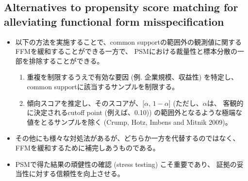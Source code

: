 \subsection{Alternatives to propensity score matching for alleviating functional form misspecification}
\begin{itemize}
 \item 以下の方法を実施することで、common supportの範囲外の観測値に関するFFMを緩和することができる一方で、
       PSMにおける裁量性と標本分散の一部を排除することができる。
       \begin{enumerate}
        \item 重複を制限するうえで有効な要因 (例. 企業規模、収益性) を特定し、common supportに該当するサンプルを制限する。
        \item 傾向スコアを推定し、そのスコアが、[$\alpha$, $1-\alpha$] (ただし、$\alpha$は、
              客観的に決定されるcutoff point (例えば、0.10)) の範囲外となるような極端な値をとるサンプルを除く (Crump, Hotz, Imbens and Mitnik 2009)。
       \end{enumerate}
 \item その他にも様々な対処法があるが、どちらか一方を代替するのではなく、FFMを緩和するために補完しあうものである。
 \item PSMで得た結果の頑健性の確認 (stress testing) こそ重要であり、
       証拠の妥当性に対する信頼性を向上させる。
\end{itemize}


